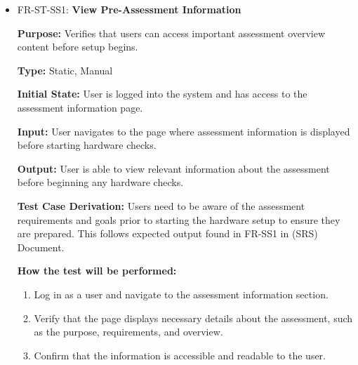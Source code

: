 \documentclass[12pt, titlepage]{article}
\begin{document}
\begin{itemize}
  \item FR-ST-SS1: \textbf{View Pre-Assessment Information}
  \begin{mdframed}[linewidth=0.5mm]
      \textbf{Purpose:} Verifies that users can access important assessment overview content before setup begins. \par
      \textbf{Type:} Static, Manual \par
      \textbf{Initial State:} User is logged into the system and has access to the assessment information page. \par
      \textbf{Input:} User navigates to the page where assessment information is displayed before starting hardware checks. \par
      \textbf{Output:} User is able to view relevant information about the assessment before beginning any hardware checks. \par
      \textbf{Test Case Derivation:} Users need to be aware of the assessment requirements and goals prior to starting 
      the hardware setup to ensure they are prepared. This follows expected output found in FR-SS1 in (SRS) Document. \par
      \textbf{How the test will be performed:}
      \begin{enumerate}[noitemsep]
        \item Log in as a user and navigate to the assessment information section.
        \item Verify that the page displays necessary details about the assessment, such as the purpose, requirements, and overview.
        \item Confirm that the information is accessible and readable to the user.
      \end{enumerate}
  \end{mdframed}


\end{itemize}
\end{document}
